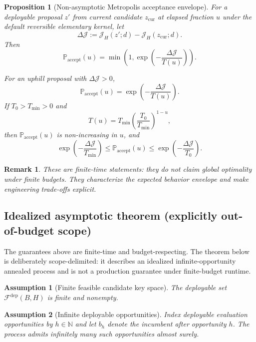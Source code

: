 \documentclass[11pt]{article}
\newtheorem{proposition}{Proposition}
\newtheorem{remark}{Remark}
\newtheorem{assumption}{Assumption}
\begin{document}
\begin{proposition}[Non-asymptotic Metropolis acceptance envelope]\label{prop:accept-envelope}
For a deployable proposal $z'$ from current candidate $z_{\mathrm{cur}}$ at
elapsed fraction $u$ under the default reversible elementary kernel, let
\[
\Delta\mathcal{J}:=\mathcal{J}_H(z';d)-\mathcal{J}_H(z_{\mathrm{cur}};d).
\]
Then
\[
\mathbb{P}_{\mathrm{accept}}(u)=
\min\!\left(1,
\exp\!\left(-\dfrac{\Delta\mathcal{J}}{T(u)}\right)
\right).
\]

For an uphill proposal with $\Delta\mathcal{J}>0$,
\[
\mathbb{P}_{\mathrm{accept}}(u)=
\exp\!\left(-\frac{\Delta\mathcal{J}}{T(u)}\right).
\]
If $T_0>T_{\min}>0$ and
\[
T(u)=T_{\min}\left(\frac{T_0}{T_{\min}}\right)^{1-u},
\]
then $\mathbb{P}_{\mathrm{accept}}(u)$ is non-increasing in $u$, and
\[
\exp\!\left(-\frac{\Delta\mathcal{J}}{T_{\min}}\right)
\le
\mathbb{P}_{\mathrm{accept}}(u)
\le
\exp\!\left(-\frac{\Delta\mathcal{J}}{T_0}\right).
\]
\end{proposition}

\begin{remark}
These are finite-time statements: they do not claim global optimality under finite budgets. They characterize the expected behavior envelope and make engineering trade-offs explicit.
\end{remark}

\subsection{Idealized asymptotic theorem (explicitly out-of-budget scope)}\label{sec:annealed-asymptotic-scope}

The guarantees above are finite-time and budget-respecting. The theorem below
is deliberately scope-delimited: it describes an idealized infinite-opportunity
annealed process and is not a production guarantee under finite-budget runtime.

\begin{assumption}[Finite feasible candidate key space]\label{ass:finite-success-key-space}
The deployable set $\mathcal{F}^{\mathrm{dep}}(B,H)$ is finite and
nonempty.
\end{assumption}

\begin{assumption}[Infinite deployable opportunities]\label{ass:infinite-success-opportunities}
Index deployable evaluation opportunities by $h\in\mathbb{N}$ and let $b_h$
denote the incumbent after opportunity $h$. The process admits infinitely many
such opportunities almost surely.
\end{assumption}
\end{document}
